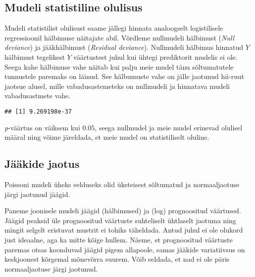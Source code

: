 \documentclass[
]{book}
\newenvironment{Shaded}{\begin{snugshade}}{\end{snugshade}}
\newcommand{\AttributeTok}[1]{\textcolor[rgb]{0.77,0.63,0.00}{#1}}
\newcommand{\FunctionTok}[1]{\textcolor[rgb]{0.00,0.00,0.00}{#1}}
\newcommand{\NormalTok}[1]{#1}
\newcommand{\OtherTok}[1]{\textcolor[rgb]{0.56,0.35,0.01}{#1}}
\newcommand{\SpecialCharTok}[1]{\textcolor[rgb]{0.00,0.00,0.00}{#1}}
\begin{document}
\hypertarget{mudeli-statistiline-olulisus-1}{%
\subsection{Mudeli statistiline olulisus}\label{mudeli-statistiline-olulisus-1}}

Mudeli statistilist olulisust saame jällegi hinnata analoogselt logistilisele regressioonil hälbimuse näitajate abil. Võrdleme nullmudeli hälbimust (\emph{Null deviance}) ja jääkhälbimust (\emph{Residual deviance}). Nullmudeli hälbimus hinnatud \(Y\) hälbimust tegelikest \(Y\) väärtustest juhul kui ühtegi prediktorit mudelis ei ole. Seega kahe hälbimuse vahe näitab kui palju meie mudel tänu sõltumatutele tunnustele paremaks on läinud. See hälbumuste vahe on jälle jaotunud hii-ruut jaotsue alusel, mille vabadusastemeteks on nullmudeli ja hinnatava mudeli vabadusastmete vahe.

\begin{Shaded}
\end{Shaded}

\begin{verbatim}
## [1] 9.269198e-37
\end{verbatim}

\emph{p}-väärtus on väiksem kui \(0.05\), seega nullmudel ja meie mudel erinevad olulisel määral ning võime järeldada, et meie mudel on statistiliselt oluline.

\hypertarget{juxe4uxe4kide-jaotus-1}{%
\subsection{Jääkide jaotus}\label{juxe4uxe4kide-jaotus-1}}

Poissoni mudeli üheks eelduseks olid üksteisest sõltumatud ja normaaljaotuse järgi jaotunud jäägid.

Paneme joonisele mudeli jäägid (hälbimused) ja (log) prognoositud väärtused. Jäägid peaksid üle prognoositud väärtuste suhteliselt ühtlaselt jaotuma ning mingit selgelt eristuvat mustrit ei tohiks täheldada. Antud juhul ei ole olukord just ideaalne, aga ka mitte kõige hullem. Näeme, et prognoositud väärtuste paremas otsas koonduvad jäägid pigem allapoole, samas jääkide variatiivsus on keskjoonest kõrgemal mõnevõrra suurem. Võib eeldada, et nad ei ole päris normaaljaotuse järgi jaotunud.
\end{document}
